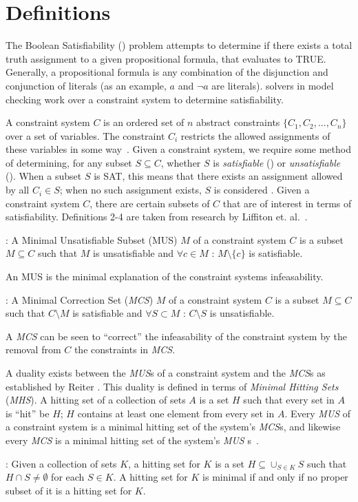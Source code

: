 \section{Definitions}
\label{sec:definitions}
The Boolean Satisfiability (\sat) problem attempts to determine if there exists a total truth assignment to a given propositional formula, that evaluates to TRUE. Generally, a propositional formula is any combination of the disjunction and conjunction of literals (as an example, $a$ and $\neg a$ are literals). \sat solvers in model checking work over a constraint system to determine satisfiability.

A constraint system $C$ is an ordered set of $n$ abstract constraints $\{C_1, C_2, ..., C_n\}$ over a set of variables. The constraint $C_i$ restricts the allowed assignments of these variables in some way~\cite{liffiton2016fast}. Given a constraint system, we require some method of determining, for any subset $S \subseteq C$, whether $S$ is \textit{satisfiable} (\sat) or \textit{unsatisfiable} (\unsat). When a subset $S$ is SAT, this means that there exists an assignment allowed by all $C_i \in S$; when no such assignment exists, $S$ is considered \unsat. Given a constraint system $C$, there are certain subsets of $C$ that are of interest in terms of satisfiability. Definitions 2-4 are taken from research by Liffiton et. al.~\cite{liffiton2016fast}. 

\begin{definition} : A Minimal Unsatisfiable Subset (MUS) $M$ of a constraint system $C$ is a subset $M \subseteq C$ such that $M$ is unsatisfiable and $\forall c \in M$ : $M \setminus \{c\}$ is satisfiable. 
\end{definition}
An MUS is the minimal explanation of the constraint systems infeasability. 
\begin{definition} : A Minimal Correction Set (\textit{MCS}) $M$ of a constraint system $C$ is a subset $M\subseteq C$ such that $C \setminus M$ is satisfiable and $\forall S \subset M$ : $C \setminus S$ is unsatisfiable. 
\end{definition}
A \textit{MCS} can be seen to ``correct'' the infeasability of the constraint system by the removal from $C$ the constraints in \textit{MCS}.

A duality exists between the \textit{MUS}s of a constraint system and the \textit{MCS}s as established by Reiter \cite{reiter1987theory}. This duality is defined in terms of \textit{Minimal Hitting Sets} (\textit{MHS}). A hitting set of a collection of sets $A$ is a set $H$ such that every set in $A$ is ``hit'' be $H$; $H$ contains at least one element from every set in $A$. Every \textit{MUS} of a constraint system is a minimal hitting set of the system's \textit{MCS}s, and likewise every \textit{MCS} is a minimal hitting set of the system's \textit{MUS} s~\cite{liffiton2016fast, reiter1987theory, de1987diagnosing}.
\begin{definition}: Given a collection of sets $K$, a hitting set for $K$ is a set $H \subseteq \cup_{S \in K} S$ such that $H \cap S \neq \emptyset$ for each $S  \in K$. A hitting set for $K$ is minimal if and only if no proper subset of it is a hitting set for $K$. 
\end{definition}

